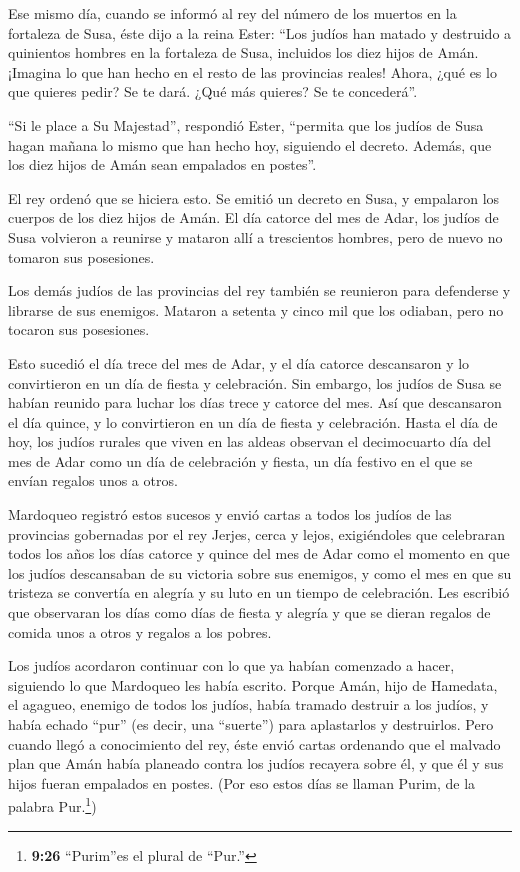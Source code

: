  Ese mismo día, cuando se informó al rey del número de los
muertos en la fortaleza de Susa,  éste dijo a la reina
Ester: ``Los judíos han matado y destruido a quinientos hombres en la
fortaleza de Susa, incluidos los diez hijos de Amán. ¡Imagina lo que han
hecho en el resto de las provincias reales! Ahora, ¿qué es lo que
quieres pedir? Se te dará. ¿Qué más quieres? Se te concederá''.

 ``Si le place a Su Majestad'', respondió Ester, ``permita
que los judíos de Susa hagan mañana lo mismo que han hecho hoy,
siguiendo el decreto. Además, que los diez hijos de Amán sean empalados
en postes''.

 El rey ordenó que se hiciera esto. Se emitió un decreto en
Susa, y empalaron los cuerpos de los diez hijos de Amán. 
El día catorce del mes de Adar, los judíos de Susa volvieron a reunirse
y mataron allí a trescientos hombres, pero de nuevo no tomaron sus
posesiones.

 Los demás judíos de las provincias del rey también se
reunieron para defenderse y librarse de sus enemigos. Mataron a setenta
y cinco mil que los odiaban, pero no tocaron sus posesiones.

 Esto sucedió el día trece del mes de Adar, y el día
catorce descansaron y lo convirtieron en un día de fiesta y celebración.
 Sin embargo, los judíos de Susa se habían reunido para
luchar los días trece y catorce del mes. Así que descansaron el día
quince, y lo convirtieron en un día de fiesta y celebración.
 Hasta el día de hoy, los judíos rurales que viven en las
aldeas observan el decimocuarto día del mes de Adar como un día de
celebración y fiesta, un día festivo en el que se envían regalos unos a
otros.

 Mardoqueo registró estos sucesos y envió cartas a todos
los judíos de las provincias gobernadas por el rey Jerjes, cerca y
lejos,  exigiéndoles que celebraran todos los años los días
catorce y quince del mes de Adar  como el momento en que
los judíos descansaban de su victoria sobre sus enemigos, y como el mes
en que su tristeza se convertía en alegría y su luto en un tiempo de
celebración. Les escribió que observaran los días como días de fiesta y
alegría y que se dieran regalos de comida unos a otros y regalos a los
pobres.

 Los judíos acordaron continuar con lo que ya habían
comenzado a hacer, siguiendo lo que Mardoqueo les había escrito.
 Porque Amán, hijo de Hamedata, el agagueo, enemigo de
todos los judíos, había tramado destruir a los judíos, y había echado
``pur'' (es decir, una ``suerte'') para aplastarlos y destruirlos.
 Pero cuando llegó a conocimiento del rey, éste envió
cartas ordenando que el malvado plan que Amán había planeado contra los
judíos recayera sobre él, y que él y sus hijos fueran empalados en
postes.  (Por eso estos días se llaman Purim, de la palabra
Pur.\footnote{\textbf{9:26} ``Purim''es el plural de ``Pur.''})


